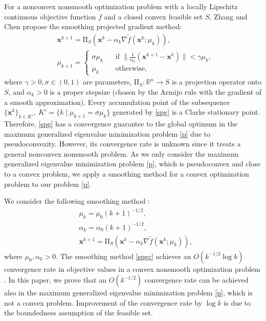 \documentclass[sn-mathphys,Numbered]{sn-jnl}%
\theoremstyle{thmstyleone}%
\theoremstyle{thmstyletwo}%
\theoremstyle{thmstylethree}%
\def\rn{\mathbb{R}^n}
\begin{document}
For a nonconvex nonsmooth optimization problem with a locally Lipschitz continuous objective function $f$ and a closed convex feasible set $S$, Zhang and Chen \cite{zhang09} propose the smoothing projected gradient method:
\begin{align}
& \bm{x}^{k+1}=\mathrm{\Pi}_S\left(\bm{x}^{k}-\alpha_k\nabla \tilde{f}(\bm{x}^{k};\mu_k)\right),\\
& \mu_{k+1}=
\begin{cases}
\sigma\mu_k\ \ \ \  &\text{if }\|\frac{1}{\alpha_k}(\bm{x}^{k+1}-\bm{x}^k)\|<\gamma \mu_k,\\
\mu_k &\text{otherwise},
\end{cases}
\label{spg}
\end{align}
where $\gamma>0, \sigma\in (0,1)$ are parameters, $\mathrm{\Pi}_S:\rn\to S$ is a projection operator onto $S$, and $\alpha_k>0$ is a proper stepsize (chosen by the Armijo rule with the gradient of a smooth approximation). Every accumulation point of the subsequence $\{\bm{x}^k\}_{k\in K'},\ K'=\{k\mid \mu_{k+1}=\sigma\mu_k\}$ generated by \eqref{spg} is a Clarke stationary point. Therefore, \eqref{spg} has a convergence guarantee to the global optimum in the maximum generalized eigenvalue minimization problem \eqref{p} due to pseudoconvexity. However, its convergence rate is unknown since it treats a general nonconvex nonsmooth problem. As we only consider the maximum generalized eigenvalue minimization problem \eqref{p}, which is pseudoconvex and close to a convex problem, we apply a smoothing method for a convex optimization problem to our problem \eqref{p}.

We consider the following smoothing method \cite{bian20c,bian20}:
\begin{align}
& \mu_{k}=\mu_0(k+1)^{-1/2},\\
& \alpha_{k}=\alpha_0(k+1)^{-1/2},\\
& \bm{x}^{k+1}=\mathrm{\Pi}_S\left(\bm{x}^{k}-\alpha_k\nabla \tilde{f}(\bm{x}^{k};\mu_k)\right),
\label{spgc}
\end{align}
where $\mu_0,\alpha_0>0$. The smoothing method \eqref{spgc} achieves an $O(k^{-1/2}\log k)$ convergence rate in objective values in a convex nonsmooth optimization problem \cite{bian20c,bian20}. In this paper, we prove that an $O(k^{-1/2})$ convergence rate can be achieved also in the maximum generalized eigenvalue minimization problem \eqref{p}, which is not a convex problem. Improvement of the convergence rate by $\log k$ is due to the boundedness assumption of the feasible set.
\end{document}
